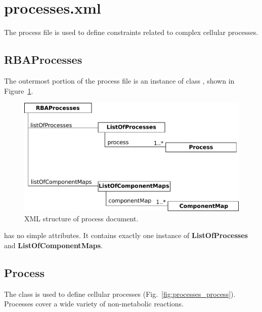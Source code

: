 
\section{processes.xml}

The process file is used to define constraints related to complex
cellular processes.

\subsection{RBAProcesses}
\label{sec:rba_processes}

The outermost portion of the process file is an instance of class
\rbaprocesses, shown in Figure~\ref{fig:processes_doc}.

\begin{figure}
  \centering
  \includegraphics[scale=0.8]{figures/processes_doc}
  \caption{XML structure of process document.}
\label{fig:processes_doc}
\end{figure}

\rbamacromolecules{} has no simple attributes.
It contains exactly one instance of \textbf{ListOfProcesses}
and \textbf{ListOfComponentMaps}.


\subsection{Process}
\label{sec:process}

The \process{} class is used to define cellular processes
(Fig.~\ref{fig:processes_process}).
Processes cover a wide variety of non-metabolic reactions.

